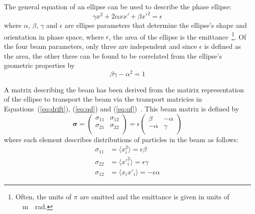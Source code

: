 
The general equation of an ellipse can be used to describe the phase ellipse:
\begin{equation}
	\gamma x^2 + 2\alpha xx' + \beta x'^2 = \epsilon
\end{equation}
where \(\alpha\),  \(\beta\), \(\gamma\) and \(\epsilon\) are ellipse parameters
that determine the ellipse's shape and orientation in phase space, where
\(\epsilon\), the area of the ellipse is the emittance~\footnote{Often, the
units of \(\pi\) are omitted and the emittance is given in units of
\si{\pi\;\meter\;\radian}.}. Of the four beam parameters, only three are
independent and since \(\epsilon\) is defined as the area, the other three can
be found to be correlated from the ellipse's geometric properties by
\begin{equation}
	\beta\gamma - \alpha^2 = 1
\end{equation}



A matrix describing the beam has been derived from the matirix representation of
the ellipse to transport the beam via the transport matricies in
Equations~(\ref{eq:drift}), (\ref{eq:qd}) and
(\ref{eq:qf})~\cite{wiedemann2007particle}. This beam matrix is defined by
\begin{equation}
	\bm{\sigma} =
	\begin{pmatrix}
		\sigma_{11} & \sigma_{12} \\
		\sigma_{21} & \sigma_{22} \\
	\end{pmatrix}
	=
	\epsilon
	\begin{pmatrix}
		\beta & -\alpha \\
		-\alpha & \gamma \\
	\end{pmatrix}
\end{equation}
where each element describes distributions of particles in the beam as follows:
\begin{align}
	\sigma_{11} &= \langle x_i^2 \rangle = \epsilon\beta \\
	\sigma_{22} &= \langle {x'}_i^2 \rangle = \epsilon\gamma \\
	\sigma_{12} &= \langle x_i x'_i \rangle = -\epsilon\alpha
\end{align}


